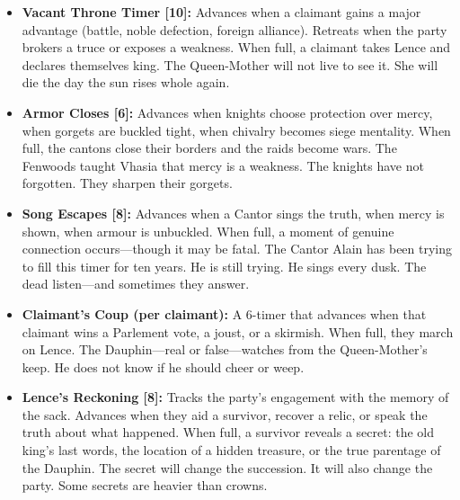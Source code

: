 \begin{itemize}
  \item \textbf{Vacant Throne Timer [10]:} Advances when a claimant gains a major advantage (battle, noble defection, foreign alliance). Retreats when the party brokers a truce or exposes a weakness. When full, a claimant takes Lence and declares themselves king. The Queen-Mother will not live to see it. She will die the day the sun rises whole again.
  \item \textbf{Armor Closes [6]:} Advances when knights choose protection over mercy, when gorgets are buckled tight, when chivalry becomes siege mentality. When full, the cantons close their borders and the raids become wars. The Fenwoods taught Vhasia that mercy is a weakness. The knights have not forgotten. They sharpen their gorgets.
  \item \textbf{Song Escapes [8]:} Advances when a Cantor sings the truth, when mercy is shown, when armour is unbuckled. When full, a moment of genuine connection occurs---though it may be fatal. The Cantor Alain has been trying to fill this timer for ten years. He is still trying. He sings every dusk. The dead listen---and sometimes they answer.
  \item \textbf{Claimant's Coup (per claimant):} A 6-timer that advances when that claimant wins a Parlement vote, a joust, or a skirmish. When full, they march on Lence. The Dauphin---real or false---watches from the Queen-Mother's keep. He does not know if he should cheer or weep.
  \item \textbf{Lence's Reckoning [8]:} Tracks the party's engagement with the memory of the sack. Advances when they aid a survivor, recover a relic, or speak the truth about what happened. When full, a survivor reveals a secret: the old king's last words, the location of a hidden treasure, or the true parentage of the Dauphin. The secret will change the succession. It will also change the party. Some secrets are heavier than crowns.
\end{itemize}


